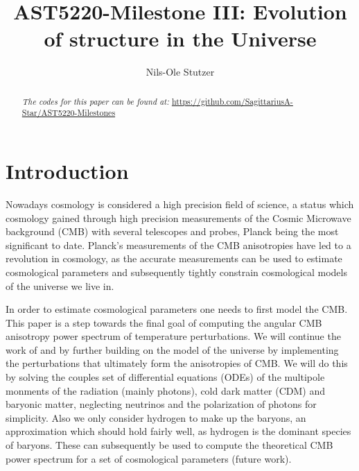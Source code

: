 \documentclass[twocolumn]{aastex62}
\begin{document}
\title{\Large AST5220-Milestone III: Evolution of structure in the Universe}

\author{Nils-Ole Stutzer}

\begin{abstract}
    
    \textit{The codes for this paper can be found at:} \newline \url{https://github.com/SagittariusA-Star/AST5220-Milestones}
\end{abstract}

\section{Introduction} \label{sec:Intro}
Nowadays cosmology is considered a high precision field of science, a status which cosmology gained through high precision measurements of the Cosmic Microwave background (CMB) with several telescopes and probes, Planck \citep[]{planckcollaboration:2018} being the most significant to date. Planck's measurements of the CMB anisotropies have led to a revolution in cosmology, as the accurate measurements can be used to estimate cosmological parameters and subsequently tightly constrain cosmological models of the universe we live in.

In order to estimate cosmological parameters one needs to first model the CMB. This paper is a step towards the final goal of computing the angular CMB anisotropy power spectrum of temperature perturbations. We will continue the work of \cite{stutzer:2020a} and \cite{stutzer:2020b} by further building on the model of the universe by implementing the perturbations that ultimately form the anisotropies of CMB. We will do this by solving the couples set of differential equations (ODEs) of the multipole monments of the radiation (mainly photons), cold dark matter (CDM) and baryonic matter, neglecting neutrinos and the polarization of photons for simplicity. Also we only consider hydrogen to make up the baryons, an approximation which should hold fairly well, as hydrogen is the dominant species of baryons. These can subsequently be used to compute the theoretical CMB power spectrum for a set of cosmological parameters (future work).
\end{document}
